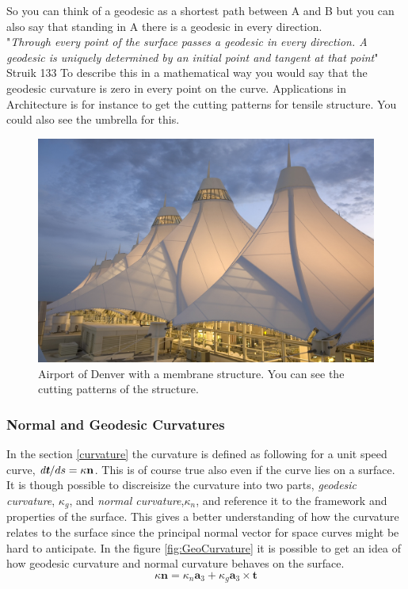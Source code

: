 So you can think of a geodesic as a shortest path between A and B but you can also say that standing in A there is a geodesic in every direction.\\
"\textit{Through every point of the surface passes a geodesic in every direction. A geodesic is uniquely determined by an initial point and tangent at that point}" Struik 133
To describe this in a mathematical way you would say that the geodesic curvature is zero in every point on the curve. 
Applications in Architecture is for instance to get the cutting patterns for tensile structure. You could also see the umbrella for this.


\begin{figure}[H]
\centering
\includegraphics[width=0.9\linewidth ]{figure/Theory/Denver.jpg}

\caption{Airport of Denver with a membrane structure. You can see the cutting patterns of the structure. }
\end{figure}

\subsubsection{Normal and Geodesic Curvatures}

In the section \ref{curvature} the curvature is defined as following for a unit speed curve,
$\textit{d\textbf{t}}/ds = \kappa \textbf{n}$. This is of course true also even if the curve lies on a surface. It is though possible to discreisize the curvature into two parts, \textit{geodesic curvature}, $\kappa_g$, and \textit{normal curvature},$\kappa_n$, and reference it to the framework and properties of the surface. This gives a better understanding of how the curvature relates to the surface since the principal normal vector for space curves might be hard to anticipate. In the figure \ref{fig:GeoCurvature} it is possible to get an idea of how geodesic curvature and normal curvature behaves on the surface.
\begin{equation}
\kappa \textbf{n} = \kappa_n \textbf{a}_3 + \kappa_g\textbf{a}_3 \times \textbf{t}
\end{equation}

